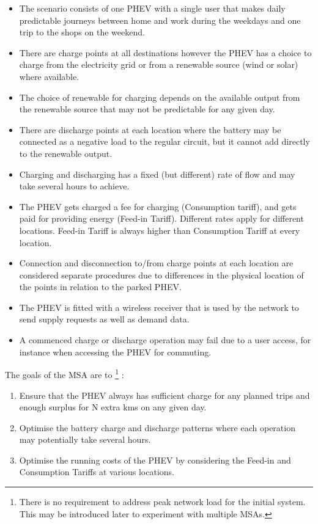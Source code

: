 \documentclass[a4paper]{article}
\begin{document}
\begin{itemize}

\item The scenario consists of one PHEV with a single user that makes daily predictable journeys between home and work during the weekdays and one trip to the shops on the weekend.

\item There are charge points at all destinations however the PHEV has a choice to charge from the electricity grid or from a renewable source (wind or solar) where available.

\item The choice of renewable for charging depends on the available output from the renewable source that may not be predictable for any given day.

\item There are discharge points at each location where the battery may be connected as a negative load to the regular circuit, but it cannot add directly to the renewable output.

\item Charging and discharging has a fixed (but different) rate of flow and may take several hours to achieve.

\item The PHEV gets charged a fee for charging (Consumption tariff), and gets paid for providing energy (Feed-in Tariff). Different rates apply for different locations. Feed-in Tariff is always higher than Consumption Tariff at every location.

\item Connection and disconnection to/from charge points at each location are considered separate procedures due to differences in the physical location of the points in relation to the parked PHEV.

\item The PHEV is fitted with a wireless receiver that is used by the network to send supply requests as well as demand data.

\item A commenced charge or discharge operation may fail due to a user access, for instance when accessing the PHEV for commuting.


\end{itemize}

The goals of the MSA are to \footnote{There is no requirement to address peak network load for the initial system. This may be introduced later to experiment with multiple MSAs.}
:
\begin{enumerate}
\item Ensure that the PHEV always has sufficient charge for any planned trips and enough surplus for N extra kms on any given day.
\item Optimise the battery charge and discharge patterns where each operation may potentially take several hours.
\item Optimise the running costs of the PHEV by considering the Feed-in and Consumption Tariffs at various locations.
\end{enumerate}
\end{document}

